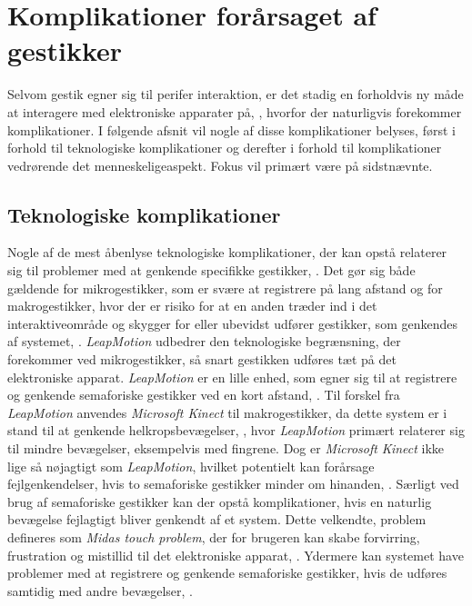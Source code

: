 \section{Komplikationer forårsaget af gestikker}
\label{KomplikationerGestikker}
%
Selvom gestik egner sig til perifer interaktion, er det stadig en forholdvis ny måde at interagere med elektroniske apparater på, \parencite[s. 163]{PDF:ComparingInputModalities}, hvorfor der naturligvis forekommer komplikationer. I følgende afsnit vil nogle af disse komplikationer belyses, først i forhold til teknologiske komplikationer og derefter i forhold til komplikationer vedrørende det menneskeligeaspekt. Fokus vil primært være på sidstnævnte.
%
\subsection{Teknologiske komplikationer}
\label{TeknologiskeKomplikationer}
%
Nogle af de mest åbenlyse teknologiske komplikationer, der kan opstå relaterer sig til problemer med at genkende specifikke gestikker, \parencite[s. 27]{PDF:ATaxonomyOfGestures}. Det gør sig både gældende for mikrogestikker, som er svære at registrere på lang afstand og for makrogestikker, hvor der er risiko for at en anden træder ind i det interaktiveområde og skygger for eller ubevidst udfører gestikker, som genkendes af systemet, \parencite[s. 9]{PDF:UsabilityofMicroVsMacroGestures}. \textit{LeapMotion} udbedrer den teknologiske begrænsning, der forekommer ved mikrogestikker, så snart gestikken udføres tæt på det elektroniske apparat. \textit{LeapMotion} er en lille enhed, som egner sig til at registrere og genkende semaforiske gestikker ved en kort afstand, \parencite[s. 7]{PDF:UsabilityofMicroVsMacroGestures}. Til forskel fra \textit{LeapMotion} anvendes \textit{Microsoft Kinect} til makrogestikker, da dette system er i stand til at genkende helkropsbevægelser, \parencite[s. 4]{PDF:UsabilityofMicroVsMacroGestures}, hvor \textit{LeapMotion} primært relaterer sig til mindre bevægelser, eksempelvis med fingrene. Dog er \textit{Microsoft Kinect} ikke lige så nøjagtigt som \textit{LeapMotion}, hvilket potentielt kan forårsage fejlgenkendelser, hvis to semaforiske gestikker minder om hinanden, \parencite[s. 3]{PDF:UsabilityofMicroVsMacroGestures}. \blankline
%
Særligt ved brug af semaforiske gestikker kan der opstå komplikationer, hvis en naturlig bevægelse fejlagtigt bliver genkendt af et system. Dette velkendte, problem defineres som \textit{Midas touch problem}, der for brugeren kan skabe forvirring, frustration og mistillid til det elektroniske apparat, \parencite[s. 109]{PDF:PIMicrogesturesKap5}. Ydermere kan systemet have problemer med at registrere og genkende semaforiske gestikker, hvis de udføres samtidig med andre bevægelser, \parencite[s. 27]{PDF:ATaxonomyOfGestures}. 

